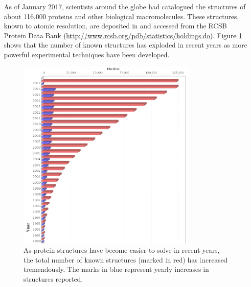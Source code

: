 As of January 2017, scientists around the globe had catalogued the structures of about 116,000 proteins and other biological macromolecules.  These structures, known to atomic resolution, are deposited in and accessed from the RCSB Protein Data Bank (\href{http://www.rcsb.org/pdb/statistics/holdings.do}{http://www.rcsb.org/pdb/statistics/holdings.do}).  Figure \ref{Fig9-1} shows that the number of known structures has exploded in recent years as more powerful experimental techniques have been developed.
\begin{figure}[h]
	\centering
	\includegraphics[width=3.5in]{./figures/Topic9/Fig9-1.png}
	\caption{As protein structures have become easier to solve in recent years, the total number of known structures (marked in red) has increased tremendously. The marks in blue represent yearly increases in structures reported.}
 	\label{Fig9-1}
\end{figure}

